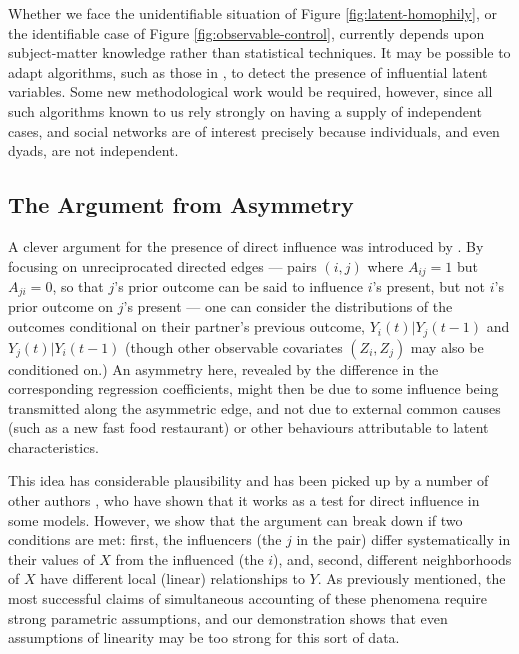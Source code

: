 \documentclass{article}
\begin{document}
\begin{multicols}{2}
Whether we face the unidentifiable situation of Figure
\ref{fig:latent-homophily}, or the identifiable case of Figure
\ref{fig:observable-control}, currently depends upon subject-matter knowledge
rather than statistical techniques. It may be possible to adapt algorithms,
such as those in \citet{Spirtes-Glymour-Scheines}, to detect the presence of
influential latent variables.  Some new methodological work would be required,
however, since all such algorithms known to us rely strongly on having a supply
of independent cases, and social networks are of interest precisely because
individuals, and even dyads, are not independent.




\subsection{The Argument from Asymmetry}
\label{sec:asymmetry}

A clever argument for the presence of direct influence was introduced by
\citet{Christakis-Fowler-spread-of-obesity}.  By focusing on unreciprocated
directed edges --- pairs $(i,j)$ where $A_{ij} = 1$ but $A_{ji} = 0$, so that
$j$'s prior outcome can be said to influence $i$'s present, but not $i$'s prior
outcome on $j$'s present --- one can consider the distributions of the outcomes
conditional on their partner's previous outcome, $Y_i(t)|Y_j(t-1)$ and
$Y_j(t)|Y_i(t-1)$ (though other observable covariates $(Z_i, Z_j)$ may also be
conditioned on.)  An asymmetry here, revealed by the difference in the
corresponding regression coefficients, might then be due to some influence
being transmitted along the asymmetric edge, and not due to external common
causes (such as a new fast food restaurant) or other behaviours attributable to
latent characteristics.

This idea has considerable plausibility and has been picked up by a number of
other authors \citep{flickr-tagging-influence,bramoulle2009ipetsn}, who have
shown that it works as a test for direct influence in some models.  However, we
show that the argument can break down if two conditions are met: first, the
influencers (the $j$ in the pair) differ systematically in their values of $X$
from the influenced (the $i$), and, second, different neighborhoods of $X$ have
different local (linear) relationships to $Y$. As previously mentioned, the
most successful claims of simultaneous accounting of these phenomena require
strong parametric assumptions, and our demonstration shows that even
assumptions of linearity may be too strong for this sort of data.


\end{multicols}
\end{document}
